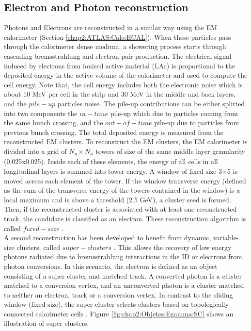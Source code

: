\subsection{Electron and Photon reconstruction}
\label{chap2:Objects:Egamma}
Photons and Electrons are reconstructed in a similar way using the EM calorimeter (Section \ref{chap2:ATLAS:Calo:ECAL}). When these particles pass through the calorimeter dense medium, a showering process starts through cascading bremsstrahlung and electron pair production. The electrical signal induced by electrons from ionised active material (LAr) is proportional to the deposited energy in the active volume of the calorimeter and used to compute the cell energy. Note that, the cell energy includes both the electronic noise which is about 10 MeV per cell in the strip and 30 MeV in the middle and back layers, and the $pile-up$ particles noise. The pile-up contributions can be either splitted into two components the $in-time$ pile-up which due to particles coming from the same bunch crossing, and the $out-of-time$ pile-up due to particles from previous bunch crossing. The total deposited energy is measured from the reconstructed EM clusters. To reconstruct the EM clusters, the EM calorimeter is divided into a grid of $N_\eta\times N_\phi$ towers of size of the same middle layer granularity (0.025x0.025). Inside each of these elements, the energy of all cells in all longitudinal layers is summed into tower energy. A window of fixed size 3×5 is moved across each element of the tower. If the window transverse energy \eT (defined as the sum of the transverse energy of the towers contained in the window) is a local maximum and is above a threshold (2.5 GeV), a cluster seed is formed. Then, if the reconstructed cluster is associated with at least one reconstructed track, the candidate is classified as an electron. These reconstruction algorithm is called $fixed-size$ \cite{Fixed_size_cluster}. \\
A second reconstruction has been developed to benefit from dynamic, variable-size clusters, called $super-clusters$ \cite{Egamma_Perf_run2}. This allows the recovery of low energy photons radiated due to bremsstrahlung interactions in the ID or electrons from photon conversions. In this scenario, the electron is defined as an object consisting of a super cluster and matched track. A converted photon is a cluster matched to a conversion vertex, and an unconverted photon is a cluster matched to neither an electron, track or a conversion vertex. In contrast to the sliding window (fixed-size), the super-cluster selects clusters based on topologically connected calorimeter cells \cite{Topo_cluster}. Figure \ref{fig:chap2:Objetcs:Egamma:SC} shows an illustration of super-clusters. 
